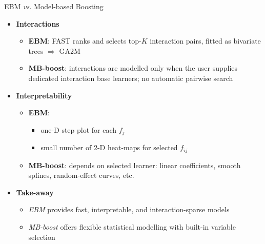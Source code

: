 \documentclass[10pt,compress,t,notes=noshow, xcolor=table]{beamer}
\begin{document}
\begin{frame}{EBM \textit{vs.} Model-based Boosting}
\small
\begin{itemize}
  \item \textbf{Interactions}
        \begin{itemize}
          \item \textbf{EBM}: FAST ranks and selects top-$K$ interaction pairs, fitted as bivariate trees $\Rightarrow$ GA2M  
          \item \textbf{MB-boost}: interactions are modelled only when the
                user supplies dedicated interaction base learners;
                no automatic pairwise search
        \end{itemize}
\pause
  \item \textbf{Interpretability}
        \begin{itemize}
          \item \textbf{EBM}:
          \begin{itemize}
              \item one-D step plot for each $f_{j}$
              \item small number of 2-D heat-maps for selected $f_{ij}$
          \end{itemize} 
          \item \textbf{MB-boost}: depends on selected learner: linear
                coefficients, smooth splines, random-effect curves, etc. %
        \end{itemize}
\pause
  \item \textbf{Take-away}  
  \begin{itemize}
      \item \emph{EBM} provides fast, interpretable, and interaction-sparse models
      \item \emph{MB-boost} offers flexible statistical modelling with built-in variable selection %
  \end{itemize}
\end{itemize}
\end{frame}


\endlecture
\end{document}
